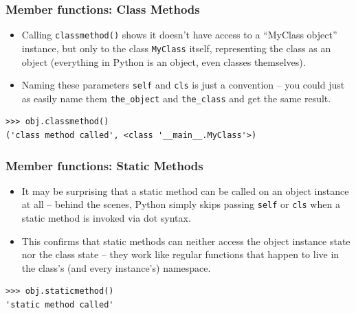 \begin{frame}[fragile]\frametitle{Member functions: Class Methods}

  \begin{itemize}
  \item Calling \lstinline|classmethod()| shows it doesn't have access to a ``MyClass object'' instance, but only to the class \texttt{MyClass} itself, representing the class as an object (everything in Python is an object, even classes themselves).

  \item Naming these parameters \texttt{self} and \texttt{cls} is just a convention -- you could just as easily name them \texttt{the\_object} and \texttt{the\_class} and get the same result.
  \end{itemize}
\begin{lstlisting}
>>> obj.classmethod()
('class method called', <class '__main__.MyClass'>)
\end{lstlisting}

\end{frame}

\begin{frame}[fragile]\frametitle{Member functions: Static Methods}

  \begin{itemize}
  \item It may be surprising that a static method can be called on an object instance at all -- behind the scenes, Python simply skips passing \texttt{self} or \texttt{cls} when a static method is invoked via dot syntax.
  \item This confirms that static methods can neither access the object instance state nor the class state -- they work like regular functions that happen to live in the class's (and every instance's) namespace.
  \end{itemize}
\begin{lstlisting}
>>> obj.staticmethod()
'static method called'
\end{lstlisting}
\end{frame}


